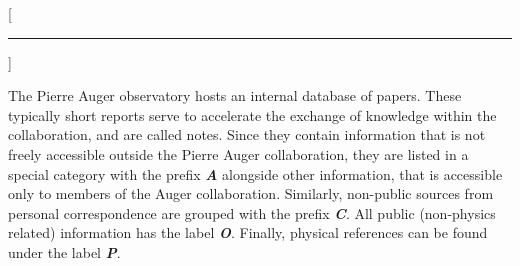 
[\hrule\vspace{-0.5cm}]
\printbibheading

The Pierre Auger observatory hosts an internal database of papers. These 
typically short reports serve to accelerate the exchange of knowledge within the
collaboration, and are called \GAP notes. Since they contain information that is
not freely accessible outside the Pierre Auger collaboration, they are listed in
a special category with the prefix \textbf{\textit{A}} alongside other 
information, that is accessible only to members of the Auger collaboration. 
Similarly, non-public sources from personal correspondence are grouped with the 
prefix \textbf{\textit{C}}. All public (non-physics related) information has the
label \textbf{\textit{O}}. Finally, physical references can be found under the 
label \textbf{\textit{P}}.

\newrefcontext[labelprefix=A]
\printbibliography[keyword={auger},title={Auger internal},heading=subbibliography]

\newrefcontext[labelprefix=C]
\printbibliography[keyword={private},title={Private Communication},heading=subbibliography]

\newrefcontext[labelprefix=O]
\printbibliography[notkeyword={private},notkeyword={phys},notkeyword={auger},title={Other References},heading=subbibliography]

\newrefcontext[labelprefix=P]
\printbibliography[keyword={phys},notkeyword={auger},title={Physics References},heading=subbibliography]

\cleardoublepage
